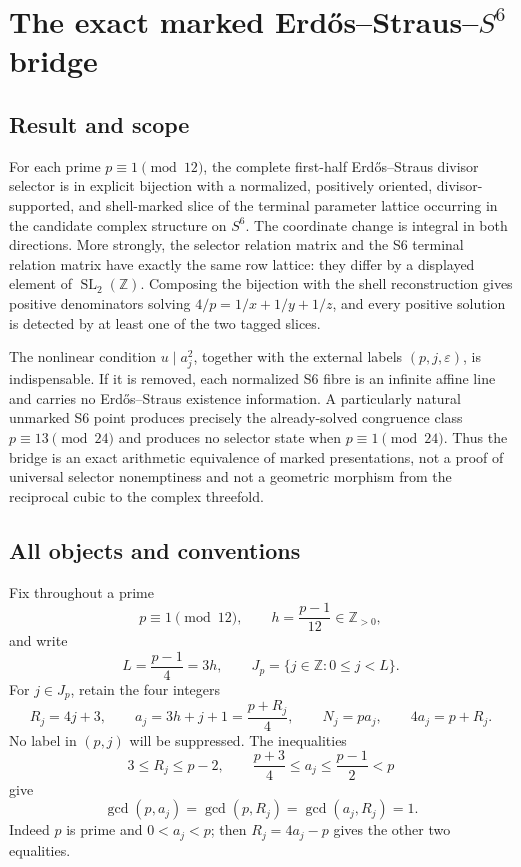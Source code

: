 \providecommand{\ZZ}{\mathbb Z}
\providecommand{\ZZpos}{\mathbb Z_{>0}}
\providecommand{\ES}{\operatorname{ES}}
\providecommand{\Rel}{\operatorname{Rel}}
\providecommand{\coker}{\operatorname{coker}}
\providecommand{\eps}{\varepsilon}

\section{The exact marked Erd\H{o}s--Straus--\texorpdfstring{\(S^6\)}{S6} bridge}
\label{sec:esksb-bridge}

\subsection*{Result and scope}
For each prime \(p\equiv1\pmod {12}\), the complete first-half
Erd\H{o}s--Straus divisor selector is in explicit bijection with a
normalized, positively oriented, divisor-supported, and shell-marked slice of
the terminal parameter lattice occurring in the candidate complex structure
on \(S^6\).  The coordinate change is integral in both directions.  More
strongly, the selector relation matrix and the S6 terminal relation matrix
have exactly the same row lattice: they differ by a displayed element of
\(\operatorname{SL}_2(\ZZ)\).  Composing the bijection with the shell
reconstruction gives positive denominators solving \(4/p=1/x+1/y+1/z\), and
every positive solution is detected by at least one of the two tagged slices.

The nonlinear condition \(u\mid a_j^2\), together with the external labels
\((p,j,\eps)\), is indispensable.  If it is removed, each normalized S6 fibre
is an infinite affine line and carries no Erd\H{o}s--Straus existence
information.  A particularly natural unmarked S6 point produces precisely
the already-solved congruence class \(p\equiv13\pmod {24}\) and produces no
selector state when \(p\equiv1\pmod {24}\).  Thus the bridge is an exact
arithmetic equivalence of marked presentations, not a proof of universal
selector nonemptiness and not a geometric morphism from the reciprocal cubic
to the complex threefold.

\subsection{All objects and conventions}

Fix throughout a prime
\[
 p\equiv1\pmod {12},\qquad
 h=\frac{p-1}{12}\in\ZZpos,
\]
and write
\[
 L=\frac{p-1}{4}=3h,
 \qquad J_p=\{j\in\ZZ:0\leq j<L\}.
\]
For \(j\in J_p\), retain the four integers
\begin{equation}
 R_j=4j+3,
 \qquad a_j=3h+j+1=\frac{p+R_j}{4},
 \qquad N_j=pa_j,
 \qquad 4a_j=p+R_j.                         \tag{1.1}
\end{equation}
No label in \((p,j)\) will be suppressed.  The inequalities
\[
 3\leq R_j\leq p-2,
 \qquad \frac{p+3}{4}\leq a_j\leq\frac{p-1}{2}<p
\]
give
\begin{equation}
 \gcd(p,a_j)=\gcd(p,R_j)=\gcd(a_j,R_j)=1.  \tag{1.2}
\end{equation}
Indeed \(p\) is prime and \(0<a_j<p\); then \(R_j=4a_j-p\)
gives the other two equalities.

